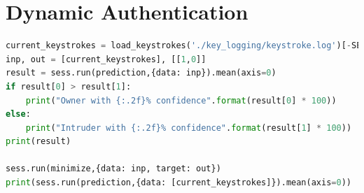 \documentclass[fancychapters]{report}
\begin{document}
\section{Dynamic Authentication}
\begin{lstlisting}[language=Python]
current_keystrokes = load_keystrokes('./key_logging/keystroke.log')[-SEQ_LENGTH:]
inp, out = [current_keystrokes], [[1,0]]
result = sess.run(prediction,{data: inp}).mean(axis=0)
if result[0] > result[1]:
    print("Owner with {:.2f}% confidence".format(result[0] * 100))
else:    
    print("Intruder with {:.2f}% confidence".format(result[1] * 100))
print(result)

sess.run(minimize,{data: inp, target: out})
print(sess.run(prediction,{data: [current_keystrokes]}).mean(axis=0))
\end{lstlisting}
\printbibliography
\end{document}
